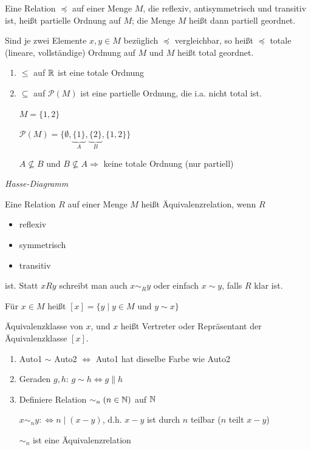 
\Def Eine Relation $\preceq$ auf einer Menge $M$, die reflexiv, antisymmetrisch und transitiv ist, heißt partielle Ordnung auf $M$; die Menge $M$ heißt dann partiell geordnet.

Sind je zwei Elemente $x, y \in M$ bezüglich $\preceq$ vergleichbar, so heißt $\preceq$ totale (lineare, vollständige) Ordnung auf $M$ und $M$ heißt total geordnet.

\Bsps
\begin{enumerate}
	\item $\leq$ auf $\mathbb{R}$ ist eine totale Ordnung
	\item $\subseteq$ auf $\mathcal{P}(M)$ ist eine partielle Ordnung, die i.a. nicht total ist.
	
	$M = \{1,2\}$
	
	$\mathcal{P}(M) = \{\emptyset, \underbrace{\{1\}}_{A}, \underbrace{\{2\}}_{B}, \{1,2\}\}$
	
	$A\nsubseteq B$ und $B \nsubseteq A \Longrightarrow$ keine totale Ordnung (nur partiell)
\end{enumerate}

\emph{Hasse-Diagramm}


\Def Eine Relation $R$ auf einer Menge $M$ heißt Äquivalenzrelation, wenn $R$
\begin{itemize}
	\item reflexiv
	\item symmetrisch
	\item transitiv
\end{itemize}

ist. Statt $xRy$ schreibt man auch $x\sim_R y$ oder einfach $x\sim y$, falls $R$ {\flqq klar ist\frqq}.

Für $x \in M$ heißt
$[x] = \{y\mid y\in M\text{ und }y\sim x\}$

Äquivalenzklasse von $x$, und $x$ heißt Vertreter oder Repräsentant der Äquivalenzklasse $[x]$.

\Bsps
\begin{enumerate}
	\item Auto1 $\sim$ Auto2 $\Longleftrightarrow$ Auto1 hat dieselbe Farbe wie Auto2
	\item Geraden $g,h$: $g\sim h \Longleftrightarrow g\|h$
	\item Definiere Relation $\sim_n (n\in \mathbb{N})$ auf $\mathbb{N}$
	
	$x\sim_n y : \Longleftrightarrow n\mid (x-y)$, d.h. $x-y$ ist durch $n$ teilbar ({\flqq $n$ teilt $x-y$\frqq})
	
	$\sim_n$ ist eine Äquivalenzrelation
\end{enumerate}

